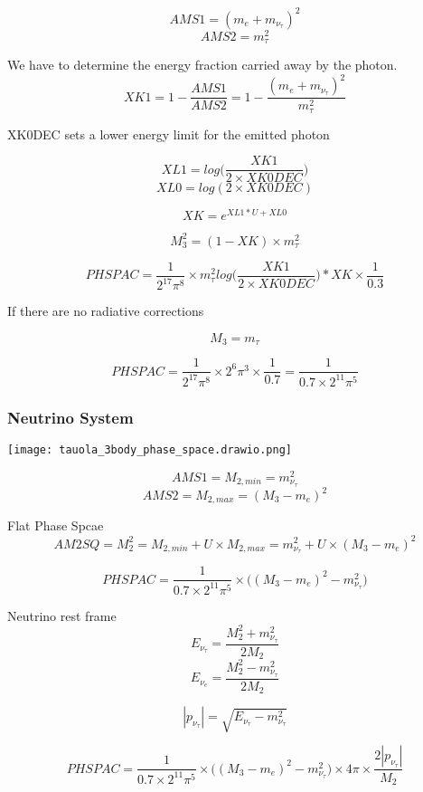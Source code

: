 \documentclass[12pt]{article}
\begin{document}
\[AMS1 = (m_{e} + m_{\nu_\tau})^2\]
\[AMS2 = m_\tau^2\]

We have to determine the energy fraction carried away by the photon.\\

\[XK1 = 1 - \frac{AMS1}{AMS2} = 1 - \frac{(m_{e} + m_{\nu_\tau})^2}{m_\tau^2}\]

XK0DEC sets a lower energy limit for the emitted photon

\[XL1 = log\Big(\frac{XK1}{2\times XK0DEC}\Big)\]
\[XL0 = log(2\times XK0DEC)\]

\[XK = e^{XL1*U + XL0}\]


\[M_{3}^2 = (1-XK)\times m_\tau^2\]


\[PHSPAC =\frac{1}{2^{17}\pi^8} \times  m_\tau^2 log\Big(\frac{XK1}{2\times XK0DEC}\Big) * XK \times \frac{1}{0.3}\]

{\color{red} If there are no radiative corrections}

\[M_{3} = m_\tau\]

\[PHSPAC  = \frac{1}{2^{17}\pi^8} \times 2^6 \pi^3 \times \frac{1}{0.7} = \frac{1}{0.7 \times 2^{11} \pi^5}\]



\subsubsection{Neutrino System}


\texttt{[image: tauola\_3body\_phase\_space.drawio.png]}


\[AMS1 = M_{2,min} = m_{\nu_\tau}^2 \]
\[AMS2 = M_{2,max} = (M_{3} - m_e)^2\]

Flat Phase Spcae \\

\[AM2SQ = M_2^2 = M_{2,min} + U \times M_{2,max}  = m_{\nu_\tau}^2 + U \times (M_{3} - m_e)^2 \]


\[PHSPAC = \frac{1}{0.7 \times 2^{11} \pi^5} \times \Big((M_{3} - m_e)^2 - m_{\nu_\tau}^2\Big)\]

Neutrino rest frame \\

\[E_{\nu_\tau} = \frac{ M_2^2 + m_{\nu_\tau}^2 }{2M_2}\]
\[E_{\nu_e} = \frac{ M_2^2 - m_{\nu_\tau}^2 }{2M_2} \]


\[|p_{\nu_\tau}| = \sqrt{E_{\nu_\tau} - m_{\nu_\tau}^2 }\]

\[PHSPAC = \frac{1}{0.7 \times 2^{11} \pi^5} \times \Big((M_{3} - m_e)^2 - m_{\nu_\tau}^2\Big)\times 4\pi \times \frac{2|p_{\nu_\tau}|}{M_2}\]
\end{document}
